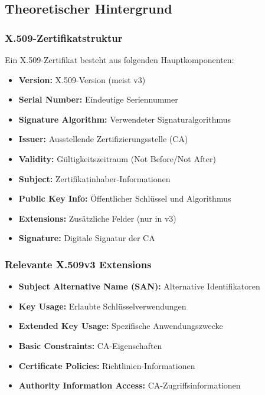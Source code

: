\documentclass{article}
\begin{document}
\subsection{Theoretischer Hintergrund}

\subsubsection{X.509-Zertifikatstruktur}
Ein X.509-Zertifikat besteht aus folgenden Hauptkomponenten:

\begin{itemize}
    \item \textbf{Version:} X.509-Version (meist v3)
    \item \textbf{Serial Number:} Eindeutige Seriennummer
    \item \textbf{Signature Algorithm:} Verwendeter Signaturalgorithmus
    \item \textbf{Issuer:} Ausstellende Zertifizierungsstelle (CA)
    \item \textbf{Validity:} Gültigkeitszeitraum (Not Before/Not After)
    \item \textbf{Subject:} Zertifikatinhaber-Informationen
    \item \textbf{Public Key Info:} Öffentlicher Schlüssel und Algorithmus
    \item \textbf{Extensions:} Zusätzliche Felder (nur in v3)
    \item \textbf{Signature:} Digitale Signatur der CA
\end{itemize}

\subsubsection{Relevante X.509v3 Extensions}
\begin{itemize}
    \item \textbf{Subject Alternative Name (SAN):} Alternative Identifikatoren
    \item \textbf{Key Usage:} Erlaubte Schlüsselverwendungen
    \item \textbf{Extended Key Usage:} Spezifische Anwendungszwecke
    \item \textbf{Basic Constraints:} CA-Eigenschaften
    \item \textbf{Certificate Policies:} Richtlinien-Informationen
    \item \textbf{Authority Information Access:} CA-Zugriffsinformationen
\end{itemize}
\end{document}
